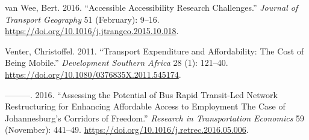 \documentclass[msc,numbers]{coppe}
\begin{document}
\begin{CSLReferences}{1}{0}
  \leavevmode\hypertarget{ref-vanwee2016accessible}{}%
  van Wee, Bert. 2016. {``Accessible Accessibility Research Challenges.''} \emph{Journal of Transport Geography} 51 (February): 9--16. \url{https://doi.org/10.1016/j.jtrangeo.2015.10.018}.

  \leavevmode\hypertarget{ref-venter2011transport}{}%
  Venter, Christoffel. 2011. {``Transport Expenditure and Affordability: {The} Cost of Being Mobile.''} \emph{Development Southern Africa} 28 (1): 121--40. \url{https://doi.org/10.1080/0376835X.2011.545174}.

  \leavevmode\hypertarget{ref-venter2016assessing}{}%
  ---------. 2016. {``Assessing the Potential of Bus Rapid Transit-Led Network Restructuring for Enhancing Affordable Access to Employment {} {The} Case of {Johannesburg}'s {Corridors} of {Freedom}.''} \emph{Research in Transportation Economics} 59 (November): 441--49. \url{https://doi.org/10.1016/j.retrec.2016.05.006}.

  \end{CSLReferences}
\end{document}

